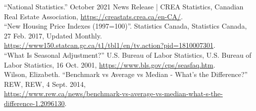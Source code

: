 \documentclass[fontsize=11pt]{article}
\begin{document}
\quad “National Statistics.” October 2021 News Release | CREA Statistics, Canadian Real Estate Association, \href{https://creastats.crea.ca/en-CA/}{https://creastats.crea.ca/en-CA/}. \\

\quad “New Housing Price Indexes (1997=100)”. Statistics Canada, Statistics Canada, 27 Feb. 2017, Updated Monthly. \href{https://www150.statcan.gc.ca/t1/tbl1/en/tv.action?pid=1810007301}{https://www150.statcan.gc.ca/t1/tbl1/en/tv.action?pid=1810007301}.  \\

\quad “What Is Seasonal Adjustment?” U.S. Bureau of Labor Statistics, U.S. Bureau of Labor Statistics, 16 Oct. 2001, \href{https://www.bls.gov/cps/seasfaq.htm}{https://www.bls.gov/cps/seasfaq.htm}.\\

\quad Wilson, Elizabeth. “Benchmark vs Average vs Median - What's the Difference?” REW, REW, 4 Sept. 2014,\\
\href{https://www.rew.ca/news/benchmark-vs-average-vs-median-what-s-the-difference-1.2096130}{https://www.rew.ca/news/benchmark-vs-average-vs-median-what-s-the-difference-1.2096130}. \\
\end{document}
